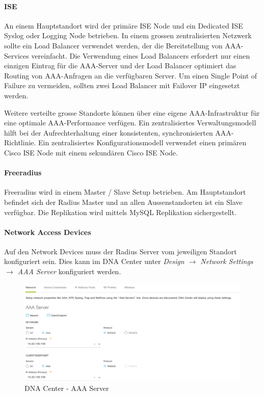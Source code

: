 \paragraph{ISE}
An einem Hauptstandort wird der primäre ISE Node und ein Dedicated ISE Syslog oder Logging Node betrieben. In einem grossen zentralisierten Netzwerk sollte ein Load Balancer verwendet werden, der die Bereitstellung von AAA-Services vereinfacht. Die Verwendung eines Load Balancers erfordert nur einen einzigen Eintrag für die AAA-Server und der Load Balancer optimiert das Routing von AAA-Anfragen an die verfügbaren Server. Um einen Single Point of Failure zu vermeiden, sollten zwei Load Balancer mit Failover IP eingesetzt werden.

Weitere verteilte grosse Standorte können über eine eigene AAA-Infrastruktur für eine optimale AAA-Performance verfügen. Ein zentralisiertes Verwaltungsmodell hilft bei der Aufrechterhaltung einer konsistenten, synchronisierten AAA-Richtlinie. Ein zentralisiertes Konfigurationsmodell verwendet einen primären Cisco ISE Node mit einem sekundären Cisco ISE Node. 

\paragraph{Freeradius}

Freeradius wird in einem Master / Slave Setup betrieben. Am Hauptstandort befindet sich der Radius Master und an allen Aussenstandorten ist ein Slave verfügbar. Die Replikation wird mittels MySQL Replikation sichergestellt.

\paragraph{Network Access Devices}

Auf den Network Devices muss der Radius Server vom jeweiligen Standort konfiguriert sein. Dies kann im DNA Center unter \textit{Design $\rightarrow$ Network Settings $\rightarrow$ AAA Server} konfiguriert werden.

\begin{figure}[H]
	\centering
	\includegraphics[width=0.8\linewidth]{img/Absicherung/DNA_Center_AAA-Server.png}
	\caption{DNA Center - AAA Server }
	\label{fig:DNA Center - AAA Server}
\end{figure}


